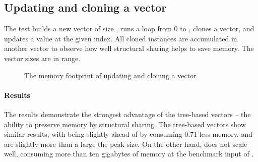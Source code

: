 \subsection{Updating and cloning a vector}
The test builds a new vector of size \n{}, runs a loop from 0 to \n{}, clones a vector, and updates a value at the given index. All cloned instances are accumulated in another vector to observe how well structural sharing helps to save memory. The vector sizes are in  range.

\begin{figure}[H]

    \center

    \caption{The memory footprint of updating and cloning a vector}
    \label{fig:mem-update-clone}
\end{figure}

\paragraph{Results}
The results demonstrate the strongest advantage of the tree-based vectors -- the ability to preserve memory by structural sharing. The tree-based vectors show similar results, with \imrsvec{} being slightly ahead of \pvec{} by consuming 0.71 less memory. \pvec{} and \imrsvec{} are slightly more than a  large the peak size. On the other hand, \stdvec{} does not scale well, consuming more than ten gigabytes of memory at the benchmark input of .
